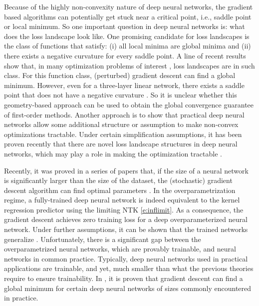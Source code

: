 \documentclass{article}
\numberwithin{equation}{section}
\newcommand{\1}{\mathds{1}}
\theoremstyle{plain} %
\begin{document}
Because of the highly non-convexity nature of deep neural networks, the gradient based algorithms can potentially get stuck near a critical point, i.e., saddle point or local minimum. So one important question in deep neural networks is: what does the loss landscape look like. 
One promising candidate for loss landscapes is the class of functions that satisfy: (i) all local minima are global minima and (ii) there exists a negative curvature for every saddle point. 
A line of recent results show that, in many optimization problems of interest \cite{ge2015escaping,ge2016matrix,sun2018geometric,sun2016complete,bhojanapalli2016global,park2016non}, loss landscapes are in such class. For this function class, (perturbed) gradient descent \cite{jin2017escape,ge2015escaping,lee2016gradient} can find a global minimum. However, even for a three-layer linear network, there exists a saddle point that does not have a negative curvature \cite{kawaguchi2016deep}. So it is unclear whether this geometry-based approach can be used to obtain the global convergence guarantee of first-order methods. Another approach is to show that  practical deep neural networks allow some additional structure or assumption to make non-convex optimizations tractable. Under certain simplification assumptions,  it has been proven  recently that there are novel loss landscape structures in deep neural networks, which may play a role in making the optimization tractable \cite{dauphin2014identifying,choromanska2015loss, kawaguchi2016deep,liang2018adding, kawaguchi2019elimination}.

Recently, it was proved in a series of   papers that, if
the size of a neural network is significantly larger than the
size of the dataset, the (stochastic) gradient descent algorithm
can find optimal parameters \cite{li2018learning,du2018gradient1,song2019quadratic,du2018gradient2,allen2018convergence,zou2018stochastic}. In the overparametrization regime, a fully-trained deep neural network is indeed equivalent to the kernel regression predictor using the limiting NTK \eqref{e:inflimit}. As a consequence, the gradient descent achieves zero training loss for a deep overparameterized neural network. Under further assumptions, it can be shown that the trained networks generalize \cite{arora2019fine,allen2018learning}. Unfortunately, there is a significant gap between the overparametrized neural networks, which are provably trainable, and neural networks in common practice. Typically, deep neural networks used in practical applications are trainable, and yet, much
smaller than what the previous theories require to ensure
trainability. In \cite{kawaguchi2019gradient}, it is proven that gradient
descent can find a global minimum for certain deep neural
networks of sizes commonly encountered in practice.
\end{document}
